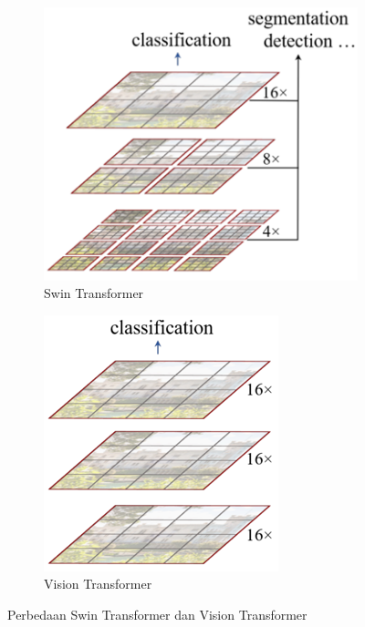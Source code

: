 \begin{figure}[h!]
  \centering
  \begin{subfigure}{.4\textwidth}
    \centering
    \includegraphics[width=.9\linewidth]{gambar/SwinTransformerLayer.png}
    \caption{Swin Transformer}
    \label{fig:swintransformerlayer}
  \end{subfigure}%
  \begin{subfigure}{.4\textwidth}
    \centering
    \includegraphics[width=.65\linewidth]{gambar/VITLayer.png}
    \caption{Vision Transformer}
    \label{vitlayer}
  \end{subfigure}
  \caption{Perbedaan Swin Transformer dan Vision Transformer}
  \label{fig:perbedaanswintransformerdanvisiontransformer}
\end{figure}

